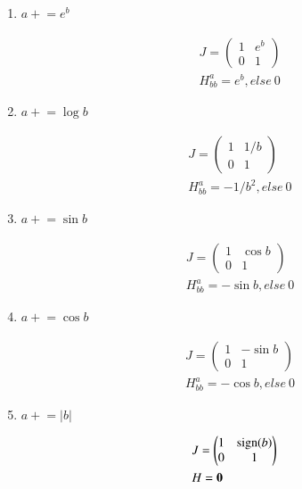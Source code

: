 \documentclass{article}
\newcommand{\<}{\langle}
\renewcommand{\>}{\rangle}
\theoremstyle{definition}\newtheorem{definition}{\textit{Definition}}
\begin{document}
\begin{multicols}{2}
\begin{enumerate}
\item $a\mathrel+=e^b$

\begin{align*}
    &J = \left(\begin{matrix}
1 &  e^b \\
0 & 1
\end{matrix}\right)\\
    &H^a_{bb} = e^b, else ~0
\end{align*}

\item $a\mathrel+=\log b$

\begin{align*}
    &J = \left(\begin{matrix}
1 &  1/b \\
0 & 1
\end{matrix}\right)\\
    &H^a_{bb} = -1/b^2, else ~0
\end{align*}

\item $a\mathrel+=\sin b$

\begin{align*}
    &J = \left(\begin{matrix}
1 &  \cos b \\
0 & 1
\end{matrix}\right)\\
    &H^a_{bb} = -\sin b, else ~0
\end{align*}

\item $a\mathrel+=\cos b$

\begin{align*}
    &J = \left(\begin{matrix}
1 &  -\sin b \\
0 & 1
\end{matrix}\right)\\
    &H^a_{bb} = -\cos b, else ~0
\end{align*}

\item $a \mathrel+= \vert b\vert$

\begin{align*}
    &J = \left(\begin{matrix}
1 &  {\rm sign} (b) \\
0 & 1
\end{matrix}\right)\\
    &H = \mathbf{0}
\end{align*}


\end{enumerate}
\end{multicols}
\end{document}
